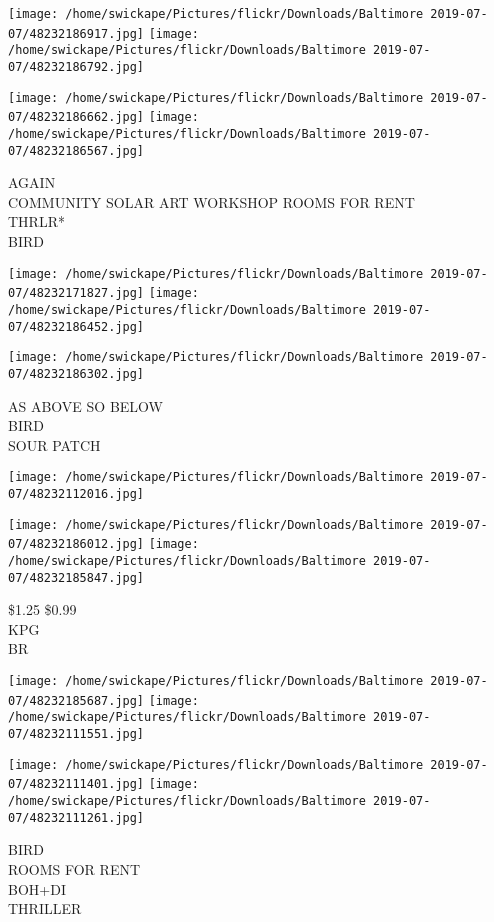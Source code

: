 \documentclass[10pt,letterpaper]{article}
\begin{document}
\texttt{[image: /home/swickape/Pictures/flickr/Downloads/Baltimore 2019-07-07/48232186917.jpg]}
\texttt{[image: /home/swickape/Pictures/flickr/Downloads/Baltimore 2019-07-07/48232186792.jpg]}

\texttt{[image: /home/swickape/Pictures/flickr/Downloads/Baltimore 2019-07-07/48232186662.jpg]}
\texttt{[image: /home/swickape/Pictures/flickr/Downloads/Baltimore 2019-07-07/48232186567.jpg]}

AGAIN\\
COMMUNITY SOLAR ART WORKSHOP ROOMS FOR RENT\\
THRLR*\\
BIRD
\pagebreak

\texttt{[image: /home/swickape/Pictures/flickr/Downloads/Baltimore 2019-07-07/48232171827.jpg]}
\texttt{[image: /home/swickape/Pictures/flickr/Downloads/Baltimore 2019-07-07/48232186452.jpg]}

\vspace{0.25in}
\texttt{[image: /home/swickape/Pictures/flickr/Downloads/Baltimore 2019-07-07/48232186302.jpg]}

AS ABOVE SO BELOW\\
BIRD\\
SOUR PATCH
\pagebreak

\texttt{[image: /home/swickape/Pictures/flickr/Downloads/Baltimore 2019-07-07/48232112016.jpg]}

\vspace{0.25in}
\texttt{[image: /home/swickape/Pictures/flickr/Downloads/Baltimore 2019-07-07/48232186012.jpg]}
\texttt{[image: /home/swickape/Pictures/flickr/Downloads/Baltimore 2019-07-07/48232185847.jpg]}

\$1.25 \$0.99\\
KPG\\
BR
\pagebreak

\texttt{[image: /home/swickape/Pictures/flickr/Downloads/Baltimore 2019-07-07/48232185687.jpg]}
\texttt{[image: /home/swickape/Pictures/flickr/Downloads/Baltimore 2019-07-07/48232111551.jpg]}

\texttt{[image: /home/swickape/Pictures/flickr/Downloads/Baltimore 2019-07-07/48232111401.jpg]}
\texttt{[image: /home/swickape/Pictures/flickr/Downloads/Baltimore 2019-07-07/48232111261.jpg]}

BIRD\\
ROOMS FOR RENT\\
BOH+DI\\
THRILLER
\pagebreak
\end{document}
